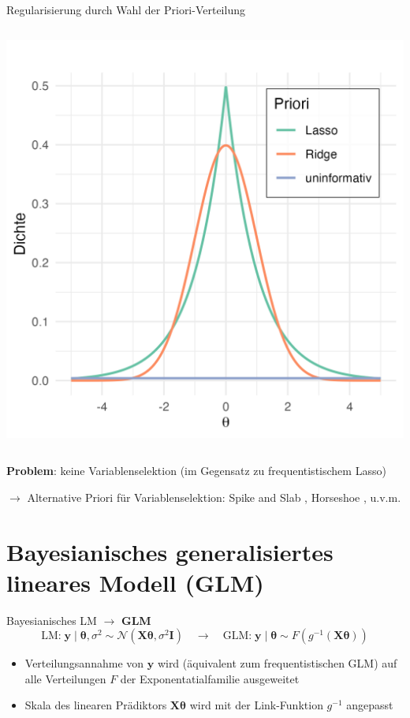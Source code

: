 \documentclass[
  ignorenonframetext,
  aspectratio=169,
]{beamer}
\providecommand{\tightlist}{%
  \setlength{\itemsep}{0pt}\setlength{\parskip}{0pt}}
\newcommand{\by}{\bm{y}}
\newcommand{\bI}{\bm{I}}
\newcommand{\bX}{\bm{X}}
\newcommand{\Ncal}{\mathcal{N}}
\newcommand{\ssd}{\sigma^2}
\newcommand{\btheta}{\bm{\theta}}
\begin{document}
\begin{frame}{Regularisierung durch Wahl der Priori-Verteilung}
\begin{columns}[T]
\begin{column}{0.45\linewidth}
\includegraphics[width=\linewidth,height=0.75\textheight,keepaspectratio]{../figures/plot_priors.png}
\end{column}
\end{columns}

\textbf{Problem}: keine Variablenselektion (im Gegensatz zu
frequentistischem Lasso)

\(\to\) Alternative Priori für Variablenselektion: Spike and Slab
\autocite{mitchell_bayesian_1988}, Horseshoe
\autocite{carvalho_horseshoe_2010}, u.v.m.
\end{frame}

\section{\texorpdfstring{Bayesianisches \textbf{generalisiertes}
lineares Modell
(GLM)}{Bayesianisches generalisiertes lineares Modell (GLM)}}\label{bayesianisches-generalisiertes-lineares-modell-glm}

\begin{frame}{Bayesianisches LM \(\to\) \textbf{GLM}}
\protect{}\label{bayesianisches-lm-to-glm}
\[
\text{LM:} \; \by \mid \btheta, \ssd \sim \Ncal(\bX \btheta, \ssd \bI) \quad
\to \quad \text{GLM:} \; \by \mid \btheta \sim F(g^{-1}(\bX \btheta))
\]

\begin{itemize}
\tightlist
\item
  Verteilungsannahme von \(\by\) wird (äquivalent zum frequentistischen
  GLM) auf alle Verteilungen \(F\) der Exponentatialfamilie ausgeweitet
\item
  Skala des linearen Prädiktors \(\bX \btheta\) wird mit der
  Link-Funktion \(g^{-1}\) angepasst
\end{itemize}
\end{frame}
\end{document}
